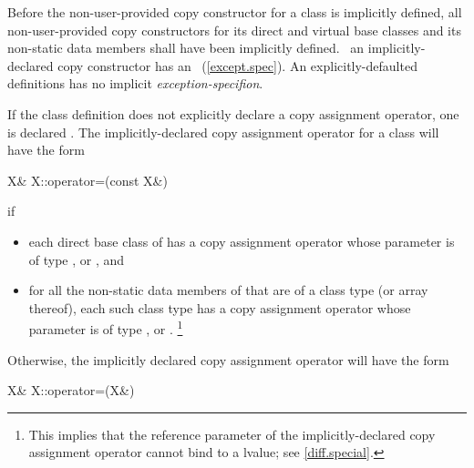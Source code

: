 \documentclass[american]{book}
\begin{document}
Before the non-user-provided copy constructor for a class is
implicitly defined,
all non-user-provided copy constructors for its direct and
virtual base classes and its non-static data members
shall have been implicitly defined.
\enternote\ 
an implicitly-declared copy constructor has an
~(\ref{except.spec}).
An explicitly-defaulted definitions has no implicit \emph{exception-specifion}.
\exitnote\ 

\setcounter{Paras}{9}
\pnum
{}%
If the class definition does not explicitly declare a copy assignment operator,
one is declared
.
The implicitly-declared copy assignment operator for a class
will have the form

\begin{codeblock}
X& X::operator=(const X&)
\end{codeblock}

if

\begin{itemize}
\item
each direct base class
of
has a copy assignment operator whose parameter is of type
,
\tcode{const}
or
,
and
\item
for all the non-static data members of
that are of a class type
(or array thereof),
each such class type has a copy assignment operator whose parameter is of type
,
\tcode{const}
or
.%
\footnote{
This implies that the reference parameter of the
implicitly-declared copy assignment operator cannot bind to a
lvalue; see \ref{diff.special}.
}
\end{itemize}

Otherwise, the implicitly declared copy
assignment operator
will have the form

\begin{codeblock}
X& X::operator=(X&)
\end{codeblock}
\end{document}
